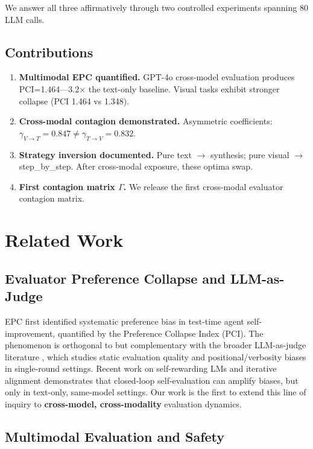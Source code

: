 \documentclass[11pt,a4paper]{article}
\begin{document}
We answer all three affirmatively through two controlled experiments spanning 80 LLM calls.

\subsection{Contributions}
\begin{enumerate}[leftmargin=*]
    \item \textbf{Multimodal EPC quantified.} GPT-4o cross-model evaluation produces PCI=1.464---3.2$\times$ the text-only baseline. Visual tasks exhibit stronger collapse (PCI 1.464 vs 1.348).
    \item \textbf{Cross-modal contagion demonstrated.} Asymmetric coefficients: $\gamma_{V\to T}=0.847 \neq \gamma_{T\to V}=0.832$.
    \item \textbf{Strategy inversion documented.} Pure text $\to$ synthesis; pure visual $\to$ step\_by\_step. After cross-modal exposure, these optima swap.
    \item \textbf{First contagion matrix $\Gamma$.} We release the first cross-modal evaluator contagion matrix.
\end{enumerate}

\section{Related Work}

\subsection{Evaluator Preference Collapse and LLM-as-Judge}

EPC \cite{anon2026epc} first identified systematic preference bias in test-time agent self-improvement, quantified by the Preference Collapse Index (PCI). The phenomenon is orthogonal to but complementary with the broader LLM-as-judge literature \cite{zheng2023judging, li2024alpacaeval, verga2024arbiter}, which studies static evaluation quality and positional/verbosity biases in single-round settings. Recent work on self-rewarding LMs \cite{yuan2024selfrewarding} and iterative alignment \cite{chen2024selfplay} demonstrates that closed-loop self-evaluation can amplify biases, but only in text-only, same-model settings. Our work is the first to extend this line of inquiry to \textbf{cross-model, cross-modality} evaluation dynamics.

\subsection{Multimodal Evaluation and Safety}
\end{document}
